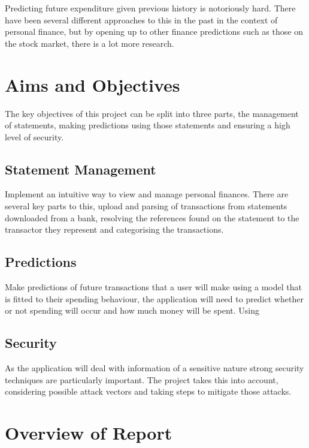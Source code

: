 Predicting future expenditure given previous history is notoriously hard. There have been several different approaches to this in the past in the context of personal finance, but by opening up to other finance predictions such as those on the stock market, there is a lot more research.

\section{Aims and Objectives}

The key objectives of this project can be split into three parts, the management of statements, making predictions using those statements and ensuring a high level of security.

\subsection{Statement Management}
Implement an intuitive way to view and manage personal finances.
There are several key parts to this, upload and parsing of transactions from statements downloaded from a bank, resolving the references found on the statement to the transactor they represent and categorising the transactions.
    
\subsection{Predictions}
Make predictions of future transactions that a user will make using a model that is fitted to their spending behaviour, the application will need to predict whether or not spending will occur and how much money will be spent.
Using

\subsection{Security}
As the application will deal with information of a sensitive nature strong security techniques are particularly important.
The project takes this into account, considering possible attack vectors and taking steps to mitigate those attacks.

\section{Overview of Report}
